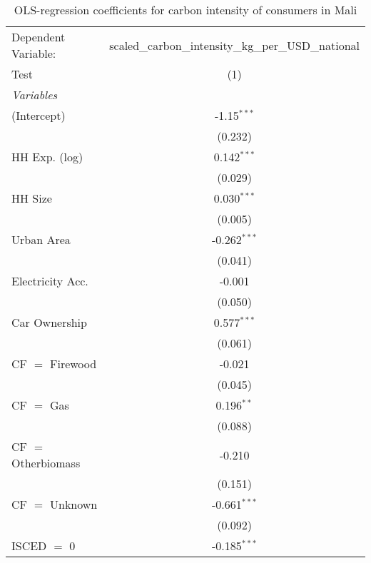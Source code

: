 
\begin{table}[htbp!]
   \centering
   \small
   \begin{adjustbox}{width = 1\textwidth, max height = 0.95\textheight, center}
      \begin{threeparttable}[b]
         \caption{\label{tab:OLS_1_MLI} OLS-regression coefficients for carbon intensity of consumers in Mali}
         \begin{tabular}{lc}
            \tabularnewline \midrule \midrule
            Dependent Variable: & scaled\_carbon\_intensity\_kg\_per\_USD\_national\\        
            Test                & (1)\\  
            \midrule
            \emph{Variables}\\
            (Intercept)         & -1.15$^{***}$\\   
                                & (0.232)\\   
            HH Exp. (log)       & 0.142$^{***}$\\   
                                & (0.029)\\   
            HH Size             & 0.030$^{***}$\\   
                                & (0.005)\\   
            Urban Area          & -0.262$^{***}$\\   
                                & (0.041)\\   
            Electricity Acc.    & -0.001\\   
                                & (0.050)\\   
            Car Ownership       & 0.577$^{***}$\\   
                                & (0.061)\\   
            CF $=$ Firewood     & -0.021\\   
                                & (0.045)\\   
            CF $=$ Gas          & 0.196$^{**}$\\   
                                & (0.088)\\   
            CF $=$ Otherbiomass & -0.210\\   
                                & (0.151)\\   
            CF $=$ Unknown      & -0.661$^{***}$\\   
                                & (0.092)\\   
            ISCED $=$ 0         & -0.185$^{***}$\\   

\end{tabular}
\end{threeparttable}
\end{adjustbox}
\end{table}
